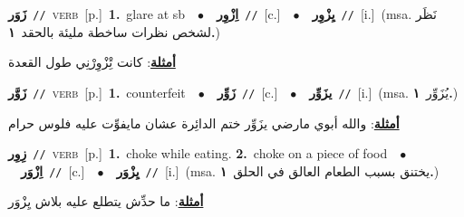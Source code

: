 \documentclass[10pt,a4paper,twoside]{article} %
\begin{document}
\begin{multicols}{2}
{\setlength\topsep{0pt}\textbf{\foreignlanguage{arabic}{زَوَر}}\ {\color{gray}\texttt{//}\color{black}}\ \textsc{verb}\ [p.]\ \textbf{1.}~glare at sb\ \ $\bullet$\ \ \setlength\topsep{0pt}\textbf{\foreignlanguage{arabic}{اِزْوِر}}\ {\color{gray}\texttt{//}\color{black}}\ [c.]\ \ $\bullet$\ \ \setlength\topsep{0pt}\textbf{\foreignlanguage{arabic}{يِزْوِر}}\ {\color{gray}\texttt{//}\color{black}}\ [i.]\ \color{gray}(msa. \foreignlanguage{arabic}{نَظَر لشخص نظرات ساخطة مليئة بالحقد}~\foreignlanguage{arabic}{\textbf{١.}})\color{black}\  \begin{flushright}\color{gray}\foreignlanguage{arabic}{\textbf{\underline{\foreignlanguage{arabic}{أمثلة}}}: كانت تِْزْوِرْنِي طول القعدة}\end{flushright}\color{black}} \vspace{2mm}

{\setlength\topsep{0pt}\textbf{\foreignlanguage{arabic}{زَوَّر}}\ {\color{gray}\texttt{//}\color{black}}\ \textsc{verb}\ [p.]\ \textbf{1.}~counterfeit\ \ $\bullet$\ \ \setlength\topsep{0pt}\textbf{\foreignlanguage{arabic}{زَوِّر}}\ {\color{gray}\texttt{//}\color{black}}\ [c.]\ \ $\bullet$\ \ \setlength\topsep{0pt}\textbf{\foreignlanguage{arabic}{يزَوِّر}}\ {\color{gray}\texttt{//}\color{black}}\ [i.]\ \color{gray}(msa. \foreignlanguage{arabic}{يُزَوِّر}~\foreignlanguage{arabic}{\textbf{١.}})\color{black}\  \begin{flushright}\color{gray}\foreignlanguage{arabic}{\textbf{\underline{\foreignlanguage{arabic}{أمثلة}}}: والله أبوي مارضي يزَوِّر ختم الدائِرة عشان مايفوِّت عليه فلوس حرام}\end{flushright}\color{black}} \vspace{2mm}

{\setlength\topsep{0pt}\textbf{\foreignlanguage{arabic}{زِوِر}}\ {\color{gray}\texttt{//}\color{black}}\ \textsc{verb}\ [p.]\ \textbf{1.}~choke while eating.  \textbf{2.}~choke on a piece of food\ \ $\bullet$\ \ \setlength\topsep{0pt}\textbf{\foreignlanguage{arabic}{اِزْوَر}}\ {\color{gray}\texttt{//}\color{black}}\ [c.]\ \ $\bullet$\ \ \setlength\topsep{0pt}\textbf{\foreignlanguage{arabic}{يِزْوَر}}\ {\color{gray}\texttt{//}\color{black}}\ [i.]\ \color{gray}(msa. \foreignlanguage{arabic}{يختنق بسبب الطعام العالق في الحلق}~\foreignlanguage{arabic}{\textbf{١.}})\color{black}\  \begin{flushright}\color{gray}\foreignlanguage{arabic}{\textbf{\underline{\foreignlanguage{arabic}{أمثلة}}}: ما حدِّش يتطلع عليه بلاش يِزْوَر}\end{flushright}\color{black}} \vspace{2mm}


\end{multicols}
\end{document}
